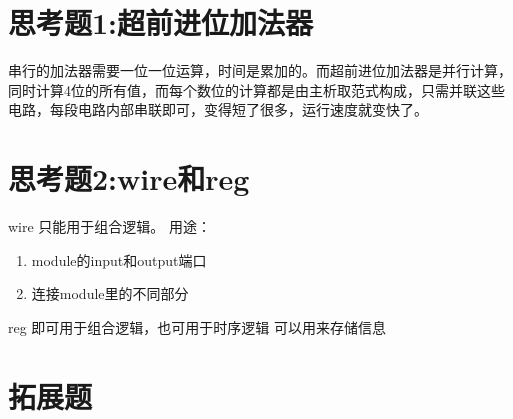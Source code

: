 \documentclass[a4paper]{article}
\begin{document}
\section{思考题1:超前进位加法器}
	串行的加法器需要一位一位运算，时间是累加的。而超前进位加法器是并行计算，同时计算4位的所有值，而每个数位的计算都是由主析取范式构成，只需并联这些电路，每段电路内部串联即可，变得短了很多，运行速度就变快了。
\section{思考题2:wire和reg}
	wire 只能用于组合逻辑。
	用途：
	\begin{enumerate}
		\item module的input和output端口
		\item 连接module里的不同部分
	\end{enumerate}

	reg 即可用于组合逻辑，也可用于时序逻辑
	可以用来存储信息
\section{拓展题}
\end{document}
